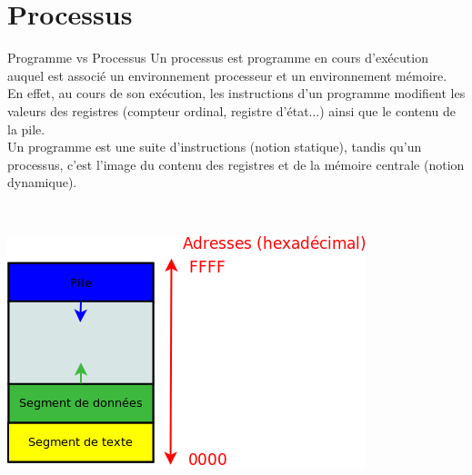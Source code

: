 	\section{Processus}
		\begin{frame}
			\begin{block}{Programme vs Processus}
			Un processus est programme en cours d'exécution auquel est associé un environnement processeur et un environnement mémoire. En effet, au cours de son exécution, les instructions d'un programme modifient les valeurs des registres (compteur ordinal, registre d'état...) ainsi que le contenu de la pile.\\
			Un programme est une suite d'instructions (notion statique), tandis qu'un processus, c'est l'image du contenu des registres et de la mémoire centrale (notion dynamique).
			\end{block}
			~\\
			\begin{center}\includegraphics[scale=0.8]{img/adr.png}\end{center}
		\end{frame}	
		
